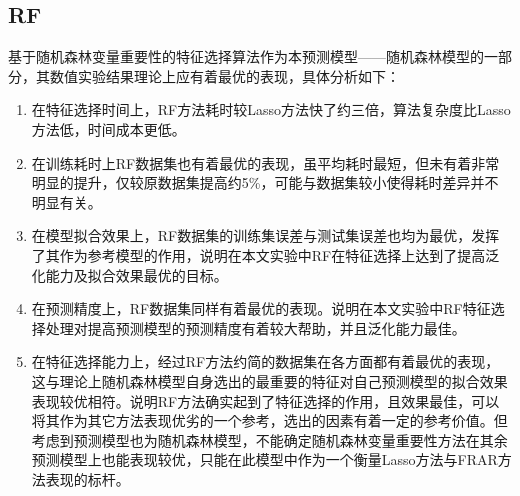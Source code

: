 \subsection{RF}
基于随机森林变量重要性的特征选择算法作为本预测模型——随机森林模型的一部分，其数值实验结果理论上应有着最优的表现，具体分析如下：
\begin{enumerate}
  \item 在特征选择时间上，RF方法耗时较Lasso方法快了约三倍，算法复杂度比Lasso方法低，时间成本更低。
  \item 在训练耗时上RF数据集也有着最优的表现，虽平均耗时最短，但未有着非常明显的提升，仅较原数据集提高约5\%，可能与数据集较小使得耗时差异并不明显有关。
  \item 在模型拟合效果上，RF数据集的训练集误差与测试集误差也均为最优，发挥了其作为参考模型的作用，说明在本文实验中RF在特征选择上达到了提高泛化能力及拟合效果最优的目标。
  \item 在预测精度上，RF数据集同样有着最优的表现。说明在本文实验中RF特征选择处理对提高预测模型的预测精度有着较大帮助，并且泛化能力最佳。
  \item 在特征选择能力上，经过RF方法约简的数据集在各方面都有着最优的表现，这与理论上随机森林模型自身选出的最重要的特征对自己预测模型的拟合效果表现较优相符。说明RF方法确实起到了特征选择的作用，且效果最佳，可以将其作为其它方法表现优劣的一个参考，选出的因素有着一定的参考价值。但考虑到预测模型也为随机森林模型，不能确定随机森林变量重要性方法在其余预测模型上也能表现较优，只能在此模型中作为一个衡量Lasso方法与FRAR方法表现的标杆。
\end{enumerate}
